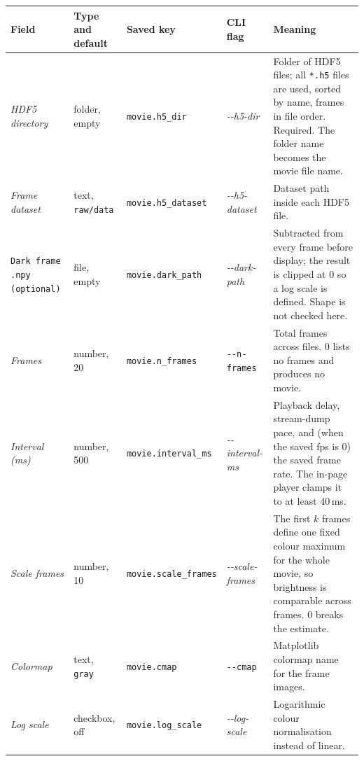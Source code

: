 \documentclass[11pt,a4paper]{article}
\newcommand{\code}[1]{\texttt{#1}}
\begin{document}
\begin{center}
\footnotesize
\begin{longtable}{@{}L{3.4cm}L{2.3cm}L{2.5cm}L{2.8cm}L{4.9cm}@{}}
\toprule
Field & Type and default & Saved key & CLI flag & Meaning \\
\midrule
\endhead
\bottomrule
\endfoot
\emph{HDF5 directory} & folder, empty & \code{movie.\allowbreak{}h5\_\allowbreak{}dir} &
\emph{-\allowbreak{}-\allowbreak{}h5-\allowbreak{}dir} & Folder of HDF5 files; all \code{*.\allowbreak{}h5} files are used,
sorted by name, frames in file order. Required. The folder name becomes the
movie file name. \\
\addlinespace
\emph{Frame dataset} & text, \code{raw/\allowbreak{}data} & \code{movie.\allowbreak{}h5\_\allowbreak{}dataset} &
\emph{-\allowbreak{}-\allowbreak{}h5-\allowbreak{}dataset} & Dataset path inside each HDF5 file. \\
\addlinespace
\code{Dark frame .npy (optional)} & file, empty & \code{movie.\allowbreak{}dark\_\allowbreak{}path} &
\emph{-\allowbreak{}-\allowbreak{}dark-\allowbreak{}path} & Subtracted from every frame before display; the result
is clipped at 0 so a log scale is defined. Shape is not checked here. \\
\addlinespace
\emph{Frames} & number, 20 & \code{movie.\allowbreak{}n\_\allowbreak{}frames} & \code{-\allowbreak{}-\allowbreak{}n-\allowbreak{}frames} &
Total frames across files. 0 lists no frames and produces no movie. \\
\addlinespace
\emph{Interval (ms)} & number, 500 & \code{movie.\allowbreak{}interval\_\allowbreak{}ms} &
\emph{-\allowbreak{}-\allowbreak{}interval-\allowbreak{}ms} & Playback delay, stream-dump pace, and (when the saved
fps is 0) the saved frame rate. The in-page player clamps it to at least
40\,ms. \\
\addlinespace
\emph{Scale frames} & number, 10 & \code{movie.\allowbreak{}scale\_\allowbreak{}frames} &
\emph{-\allowbreak{}-\allowbreak{}scale-\allowbreak{}frames} & The first $k$ frames define one fixed colour maximum
for the whole movie, so brightness is comparable across frames. 0 breaks the
estimate. \\
\addlinespace
\emph{Colormap} & text, \code{gray} & \code{movie.\allowbreak{}cmap} & \code{-\allowbreak{}-\allowbreak{}cmap} &
Matplotlib colormap name for the frame images. \\
\addlinespace
\emph{Log scale} & checkbox, off & \code{movie.\allowbreak{}log\_\allowbreak{}scale} &
\emph{-\allowbreak{}-\allowbreak{}log-\allowbreak{}scale} & Logarithmic colour normalisation instead of linear. \\

\end{longtable}
\end{center}
\end{document}
